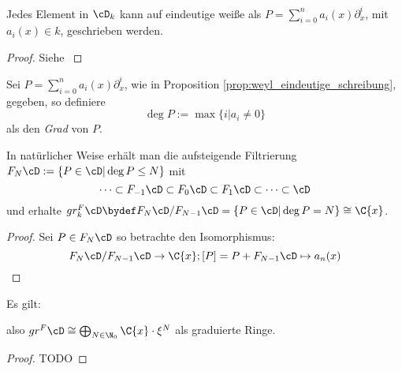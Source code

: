 \begin{prop} \label{prop:weyl_eindeutige_schreibung}
\cite[Proposition 1.2.3]{sabbah_cimpa90}
Jedes Element in $\cD_k$ kann auf eindeutige
weiße als $P=\sum_{i=0}^na_i(x)\partial_x^i$, mit $a_i(x)\in k$, geschrieben
werden.
\end{prop}
\begin{proof}
Siehe \cite[Proposition 1.2.3]{sabbah_cimpa90}
\begin{comment}
ein teil des Beweises ist "left as an exersice"
\end{comment}
\end{proof}
\begin{comment}
Gilt das folgende??
\[
\alpha_i(x)\partial_x^i \equiv \frac{\alpha_i}{x^i}(x\partial_x)^i \mod
F_{i-1}\cD
\]
\end{comment}

\begin{comment}
Besser?:\\
erst Filtrierung definieren und dadurch dann den Grad?
\end{comment}
\begin{defn}
Sei $P=\sum_{i=0}^na_i(x)\partial_x^i$, wie in Proposition
\ref{prop:weyl_eindeutige_schreibung}, gegeben, so definiere
\[
\deg P:=\max\{i|a_i\neq 0\}
\]
als den \emph{Grad} von $P$.
\end{defn}
\begin{comment}
Unabhängigkeit von Schreibung? Sabbah script!
\end{comment}
In natürlicher Weise erhält man die aufsteigende Filtrierung
$F_N\cD:=\{P\in\cD|\deg P\leq N\}$ mit
\[
\cdots\subset F_{-1}\cD\subset F_{0}\cD\subset
F_{1}\cD\subset\cdots\subset\cD
\]
und erhalte $gr_k^F\cD\bydef F_N\cD\slash F_{N-1}\cD
=\{P\in\cD|\deg P=N\}\cong\C\{x\}$.

\begin{proof}
Sei $P\in F_N\cD$ so betrachte den Isomorphismus:
\[
F_N\cD\slash F_{N-1}\cD\rightarrow \C\{x\}; [P]=P+F_{N-1}\cD\mapsto a_n(x)
\]
\end{proof}

\begin{prop}
Es gilt:
\begin{center}
\end{center}
also $gr^F\cD \cong \bigoplus_{N\in\N_0}\C\{x\}\cdot \xi^N$ als graduierte
Ringe.
\end{prop}
\begin{proof} TODO
\begin{comment}
Treffen?
\end{comment}
\end{proof}

